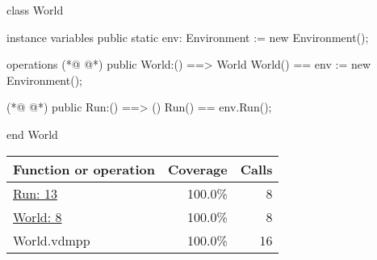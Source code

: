 \begin{vdmpp}
class World

instance variables
  public static env: Environment := new Environment();
  
  
operations
(*@
\label{World:8}
@*)
 public World:() ==> World
 World() ==
  env := new Environment();


(*@
\label{Run:13}
@*)
 public Run:() ==> ()
 Run() ==
  env.Run();


end World
\end{vdmpp}
\bigskip
\begin{longtable}{|l|r|r|}
\hline
Function or operation & Coverage & Calls \\
\hline
\hline
\hyperref[Run:13]{Run: 13} & 100.0\% & 8 \\
\hline
\hyperref[World:8]{World: 8} & 100.0\% & 8 \\
\hline
\hline
World.vdmpp & 100.0\% & 16 \\
\hline
\end{longtable}

